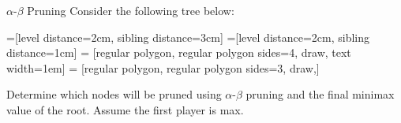 \documentclass[9pt]{beamer}
\begin{document}
\begin{frame}[fragile]{$\alpha$-$\beta$ Pruning}
  Consider the following tree below:

  =[level distance=2cm, sibling distance=3cm]
  =[level distance=2cm, sibling distance=1cm]
   = [regular polygon, regular polygon sides=4, draw, text
  width=1em]
   = [regular polygon, regular polygon sides=3, draw,]


  Determine which nodes will be pruned using $\alpha$-$\beta$ pruning and
  the final minimax value of the root. Assume the first player is {\sc max}.
\end{frame}
\end{document}
